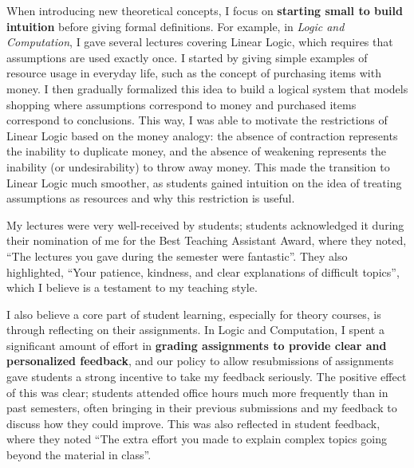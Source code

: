 \documentclass[11pt]{article}
\begin{document}
When introducing new theoretical concepts, I focus on \textbf{starting small to build intuition} before giving formal definitions.
For example, in \emph{Logic and Computation}, I gave several lectures covering Linear Logic, which requires that assumptions are used exactly once.
I started by giving simple examples of resource usage in everyday life, such as the concept of purchasing items with money.
I then gradually formalized this idea to build a logical system that models shopping where assumptions correspond to money and purchased items correspond to conclusions.
This way, I was able to motivate the restrictions of Linear Logic based on the money analogy: the absence of contraction represents the inability to duplicate money, and the absence of weakening represents the inability (or undesirability) to throw away money.
This made the transition to Linear Logic much smoother, as students gained intuition on the idea of treating assumptions as resources and why this restriction is useful.

My lectures were very well-received by students; students acknowledged it during their nomination of me for the Best Teaching Assistant Award, where they noted, ``The lectures you gave during the semester were fantastic''.
They also highlighted, ``Your patience, kindness, and clear explanations of difficult topics'', which I believe is a testament to my teaching style.

I also believe a core part of student learning, especially for theory courses, is through reflecting on their assignments.
In Logic and Computation, I spent a significant amount of effort in \textbf{grading assignments to provide clear and personalized feedback}, and our policy to allow resubmissions of assignments gave students a strong incentive to take my feedback seriously.
The positive effect of this was clear; students attended office hours much more frequently than in past semesters, often bringing in their previous submissions and my feedback to discuss how they could improve.
This was also reflected in student feedback, where they noted
``The extra effort you made to explain complex topics going beyond the material in class''.

\end{document}
